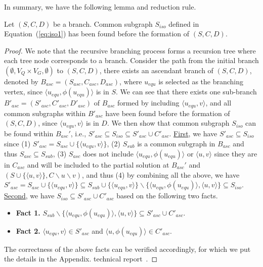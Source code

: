 In summary, we have the following lemma and reduction rule.
\begin{lemma}
    \label{lemma:reduction_for_VE1}
    Let $(S,C,D)$ be a branch. Common subgraph $S_{iso}$ {\chengC defined in} Equation~(\ref{eq:iso1}) has been found before the formation of $(S,C,D)$.
\end{lemma}
\begin{proof}
    {\revision
    We note that the recursive branching process forms a recursion tree where each tree node corresponds to a branch. Consider the path from the initial branch $(\emptyset, V_Q\times V_G,\emptyset)$ to $(S,C,D)$, there exists an ascendant branch of $(S,C,D)$, denoted by $B_{asc}=(S_{asc},C_{asc},D_{asc})$, where $u_{equ}$ is selected as the branching vertex, since $\langle u_{equ},\phi(u_{equ}) \rangle$ is in $S$.
    We can see that there exists one sub-branch $B'_{asc}=(S'_{asc},C'_{asc},D'_{asc})$ of $B_{asc}$ formed by including $\langle u_{equ},v \rangle$, and all common subgraphs within $B'_{asc}$ have been found before the formation of $(S,C,D)$, since $\langle u_{equ},v \rangle$ is in $D$. We then show that common subgraph $S_{iso}$ can be found within $B_{asc}'$, i.e., $S'_{asc}\subseteq S_{iso}\subseteq S'_{asc}\cup C'_{asc}$. 
    \underline{First}, we have $S'_{asc}\subseteq S_{iso}$ since (1) $S'_{asc}=S_{asc}\cup\{\langle u_{equ},v \rangle\}$, (2) $S_{sub}$ is a common subgraph in $B_{asc}$ and thus $S_{asc}\subseteq S_{sub}$, (3) $S_{asc}$ does not include $\langle u_{equ},\phi(u_{equ})\rangle$ or $\langle u,v\rangle$ since they are in $C_{asc}$ and will be included to the partial solution at $B_{asc}'$ and $(S\cup \{\langle u,v \rangle\}, C\backslash u\backslash v)$, and thus (4) by combining all the above, we have  $S'_{asc}=S_{asc}\cup\{\langle u_{equ},v \rangle\}\subseteq S_{sub}\cup\{\langle u_{equ},v \rangle\} \backslash \{\langle u_{equ},\phi(u_{equ})\rangle,\langle u,v\rangle\}\subseteq S_{iso}$. 
    \underline{Second}, we have $S_{iso}\subseteq S'_{asc}\cup C'_{asc}$ based on the following two facts. 

    \begin{itemize}
        \item \textbf{Fact 1.} $S_{sub}\backslash\{\langle u_{equ},\phi(u_{equ})\rangle,\langle u,v\rangle\}\subseteq S'_{asc}\cup C'_{asc}$.
        \item \textbf{Fact 2.} $\langle u_{equ},v \rangle\in S'_{asc}$ and $\langle u,\phi(u_{equ}) \rangle\in C'_{asc}$.
    \end{itemize}
    
    The correctness of the above facts can be verified accordingly, for which we put the details in the 
    \ifx \CR\undefined
Appendix. 
\else
technical report~\cite{TR}. 
\fi
    }
\end{proof}

